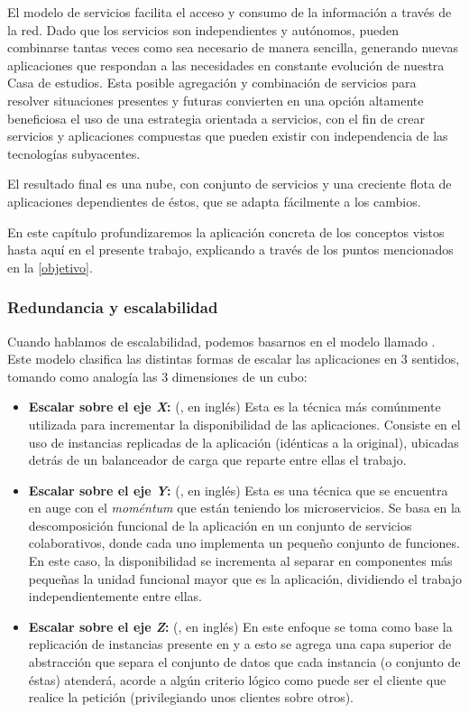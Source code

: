El modelo de servicios facilita el acceso y consumo de la información a través de la red. Dado que los servicios son independientes y autónomos, pueden combinarse tantas veces como sea necesario de manera sencilla, generando nuevas aplicaciones que respondan a las necesidades en constante evolución de nuestra Casa de estudios. Esta posible agregación y combinación de servicios para resolver situaciones presentes y futuras convierten en una opción altamente beneficiosa el uso de una estrategia orientada a servicios, con el fin de crear servicios y aplicaciones compuestas que pueden existir con independencia de las tecnologías subyacentes\cite{microsoft2006}.

El resultado final es una nube, con conjunto de servicios y una creciente flota de aplicaciones dependientes de éstos, que se adapta fácilmente a los cambios.

En este capítulo profundizaremos la aplicación concreta de los conceptos vistos hasta aquí en el presente trabajo, explicando a través de los puntos mencionados en la \autoref{objetivo}.


\subsubsection{Redundancia y escalabilidad}

Cuando hablamos de escalabilidad, podemos basarnos en el modelo llamado \cite{website:akfpartners-scale-cube}. Este modelo clasifica las distintas formas de escalar las aplicaciones en 3 sentidos, tomando como analogía las 3 dimensiones de un cubo:

\begin{itemize}
  \item \textbf{Escalar sobre el eje \textit{X}:} (, en inglés) Esta es la técnica más comúnmente utilizada para incrementar la disponibilidad de las aplicaciones. Consiste en el uso de instancias replicadas de la aplicación (idénticas a la original), ubicadas detrás de un balanceador de carga que reparte entre ellas el trabajo.
  \item \textbf{Escalar sobre el eje \textit{Y}:} (, en inglés) Esta es una técnica que se encuentra en auge con el \textit{moméntum} que están teniendo los microservicios. Se basa en la descomposición funcional de la aplicación en un conjunto de servicios colaborativos, donde cada uno implementa un pequeño conjunto de funciones. En este caso, la disponibilidad se incrementa al separar en componentes más pequeñas la unidad funcional mayor que es la aplicación, dividiendo el trabajo independientemente entre ellas.
  \item \textbf{Escalar sobre el eje \textit{Z}:} (, en inglés) En este enfoque se toma como base la replicación de instancias presente en  y a esto se agrega una capa superior de abstracción que separa el conjunto de datos que cada instancia (o conjunto de éstas) atenderá, acorde a algún criterio lógico como puede ser el cliente que realice la petición (privilegiando unos clientes sobre otros).
\end{itemize}

